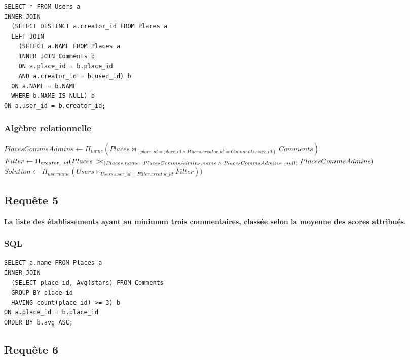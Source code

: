 \documentclass[a4paper,10pt]{article}
\def\ojoin{\setbox0=\hbox{$\bowtie$}%
  \rule[-.02ex]{.25em}{.4pt}\llap{\rule[\ht0]{.25em}{.4pt}}}
\def\leftouterjoin{\mathbin{\ojoin\mkern-5.8mu\bowtie}}
\begin{document}
\begin{verbatim}
SELECT * FROM Users a
INNER JOIN
  (SELECT DISTINCT a.creator_id FROM Places a
  LEFT JOIN
    (SELECT a.NAME FROM Places a
    INNER JOIN Comments b
    ON a.place_id = b.place_id
    AND a.creator_id = b.user_id) b
  ON a.NAME = b.NAME
  WHERE b.NAME IS NULL) b
ON a.user_id = b.creator_id; 
\end{verbatim}

\subsubsection{Algèbre relationnelle}


\hspace{-0.30cm}$ PlacesCommsAdmins \leftarrow \Pi_{name} (Places \bowtie_{(place\_id = place\_id \wedge Places.creator\_id = Comments.user\_id)} Comments ) $ \\

\hspace{-0.30cm}$ Filter \leftarrow \Pi_{creator\_id} (Places \;\leftouterjoin_{(Places.name = PlacesCommsAdmins.name\; \wedge\; PlacesCommsAdmins = null) } PlacesCommsAdmins)$ \\

\hspace{-0.30cm}$ Solution \leftarrow \Pi_{username} (Users \bowtie_{Users.user\_id = Filter.creator\_id} Filter))$

\newpage

\subsection{Requête 5}

\textbf{La liste des établissements ayant au minimum trois commentaires, classée selon la moyenne des scores attribués.}

\subsubsection{SQL}

\begin{verbatim}
SELECT a.name FROM Places a
INNER JOIN 
  (SELECT place_id, Avg(stars) FROM Comments
  GROUP BY place_id
  HAVING count(place_id) >= 3) b
ON a.place_id = b.place_id
ORDER BY b.avg ASC;
\end{verbatim}

\subsection{Requête 6}
\end{document}
